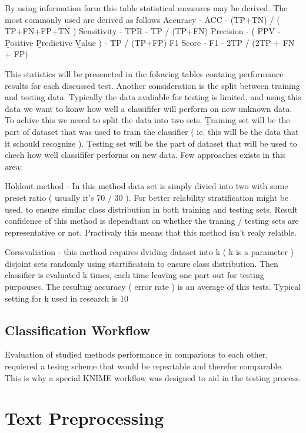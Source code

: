 By using information form this table statistical measures may be derived. The most commonly used are derived as follows
Accuracy - ACC - (TP+TN) / ( TP+FN+FP+TN )
Sensitivity - TPR - TP / (TP+FN)
Precision - ( PPV - {\b P}ositive {\b P}redictive {\b V}alue ) -  TP / (TP+FP)
F1 Score - F1 - 2TP / (2TP + FN + FP)

This statistics will be preseneted in the folowing tables containg performance results for each discussed test.  
Another consideration is the split between training and testing data. Typically the data avaliable for testing is limited, and using this data we
want to konw how well a classififer will perform on new unknown data. To achive this we neeed to split the data into two sets. {\b Training} set will be 
the part of dataset that was used to train the classifier ( ie. this will be the data that it schould recognize ). {\b Testing } set will be the
part of dataset that will be used to chech how well classififer performs on new data. Few approaches exists in this area:

Holdout method - In this method data set is simply divied into two with some preset ratio ( usually it's 70 / 30 ). For better relability stratification
	         might be used, to ensure similar class distribution in both training and testing sets.  Result confidence of this method is dependtant
		 on whether the traning / testing sets are representative or not.  Practivaly this means that this method isn't realy relaible.
		  
Corssvaliation  - this method requires dviding dataset into k ( k is a parameter ) disjoint sets randomly using startificatoin to ensure class
		  distribution. Then classifier is evaluated k times, each time leaving one part out for testing purpouses.  
		  The resultng accuracy ( error rate ) is an average of this tests. Typical setting for k used in research is 10





\subsection{ Classification Workflow }

Evaluation of studied methods performance in comparions to each other, requiered a tesing scheme that would be repeatable and therefor comparable. 
This is why a special KNIME workflow was designed to aid in the testing process. 

\section{Text Preprocessing}	

